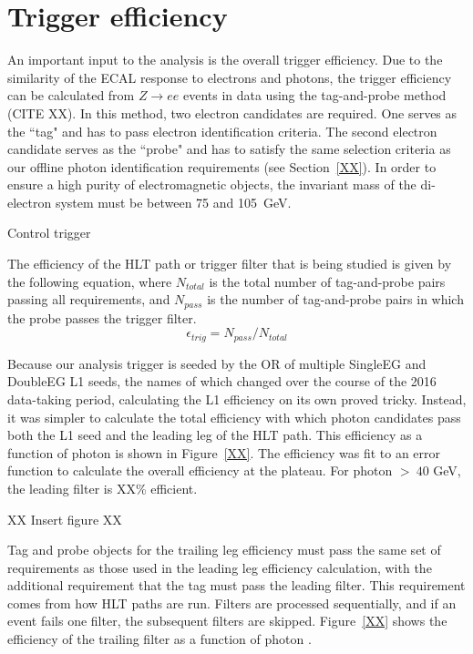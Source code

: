\section{Trigger efficiency}
\label{sec:trigEff}
An important input to the analysis is the overall trigger efficiency. Due to the similarity of the ECAL response 
to electrons and photons, the trigger efficiency can be calculated from 
$Z\rightarrow ee$ events in data using the tag-and-probe method (CITE XX). In this method, two electron candidates
are required. One serves as the ``tag" and has to pass electron identification criteria. The second electron candidate serves
as the ``probe" and has to satisfy the same selection criteria as our offline photon identification requirements (see Section~\ref{XX}). 
In order to ensure a high purity of electromagnetic objects, the invariant mass of the di-electron system must be between 75 and 105~GeV. 

Control trigger

The efficiency of the HLT path or trigger filter that is being studied is given by the following equation, where $N_{total}$ is the total number of tag-and-probe pairs 
passing all requirements, and $N_{pass}$ is the number of tag-and-probe pairs in which  the probe passes the trigger filter.
\begin{equation}
 \epsilon_{trig} = N_{pass} / N_{total}
\end{equation}

Because our analysis trigger is seeded by the OR of multiple SingleEG and DoubleEG L1 seeds, the names of which changed over the course of the 2016 data-taking period, calculating the L1 efficiency on its own proved tricky. Instead, it was simpler to calculate the total efficiency with which photon candidates pass both the L1 seed and the leading leg of the HLT path. This efficiency as a function of photon \pt is shown in Figure~\ref{XX}. The efficiency was fit to an error function to calculate the overall efficiency at the plateau. For photon \pt $>~40$ GeV, the leading filter is XX\% efficient.

XX Insert figure XX

Tag and probe objects for the trailing leg efficiency must pass the same set of requirements as those used in the leading leg efficiency calculation, with the additional requirement that the tag must pass the leading filter. This requirement comes from how HLT paths are run. Filters are processed sequentially, and if an event fails one filter, the subsequent filters are skipped. Figure~\ref{XX} shows the efficiency of the trailing filter as a function of photon \pt. 

